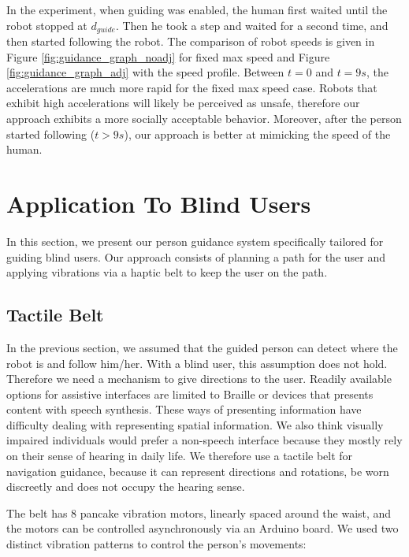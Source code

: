 In the experiment, when guiding was enabled, the human first waited until the robot stopped at $d_{guide}$. Then he took a step and waited for a second time, and then started following the robot. The comparison of robot speeds is given in Figure \ref{fig:guidance_graph_noadj} for fixed max speed and Figure \ref{fig:guidance_graph_adj} with the speed profile. Between $t=0$ and $t=9s$, the accelerations are much more rapid for the fixed max speed case. Robots that exhibit high accelerations will likely be perceived as unsafe, therefore our approach exhibits a more socially acceptable behavior. Moreover, after the person started following ($t >9s$), our approach is better at mimicking the speed of the human.


\section{Application To Blind Users}
\label{sec:guidance_blind_users}

In this section, we present our person guidance system specifically tailored for guiding blind users. Our approach consists of planning a path for the user and applying vibrations via a haptic belt to keep the user on the path.


\subsection{Tactile Belt}

In the previous section, we assumed that the guided person can detect where the robot is and follow him/her. With a blind user, this assumption does not hold. Therefore we need a mechanism to give directions to the user. Readily available options for assistive interfaces are limited to Braille or devices that presents content with speech synthesis. These ways of presenting information have difficulty dealing with representing spatial information. We also think visually impaired individuals would prefer a non-speech interface because they mostly rely on their sense of hearing in daily life. We therefore use a tactile belt for navigation guidance, because it can represent directions and rotations, be worn discreetly and does not occupy the hearing sense.

The belt has 8 pancake vibration motors, linearly spaced around the waist, and the motors can be controlled asynchronously via an Arduino board. We used two distinct vibration patterns to control the person's movements:

